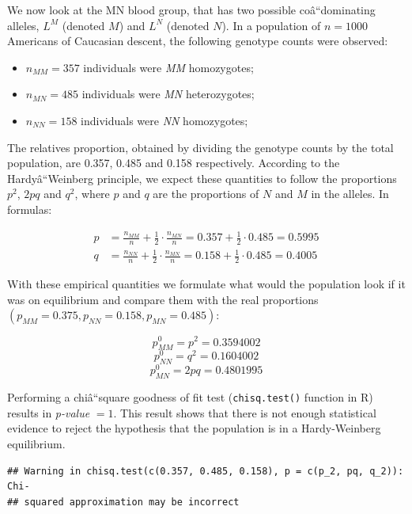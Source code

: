 \documentclass[]{article}
\begin{document}
We now look at the MN blood group, that has two possible
coâ``dominating alleles, \(L^{M}\) (denoted \(M\)) and \(L^{N}\)
(denoted \(N\)). In a population of \(n = 1000\) Americans of Caucasian
descent, the following genotype counts were observed:

\begin{itemize}
\item
  \(n_{MM} = 357\) individuals were \emph{MM} homozygotes;
\item
  \(n_{MN} = 485\) individuals were \emph{MN} heterozygotes;
\item
  \(n_{NN} = 158\) individuals were \emph{NN} homozygotes;
\end{itemize}

The relatives proportion, obtained by dividing the genotype counts by
the total population, are 0.357, 0.485 and 0.158 respectively. According
to the Hardyâ``Weinberg principle, we expect these quantities to follow
the proportions \(p^2\), \(2pq\) and \(q^2\), where \(p\) and \(q\) are
the proportions of \(N\) and \(M\) in the alleles. In formulas:

\begin{equation}
  \begin{split}
    p & = \frac{n_{MM}}{n} + \frac{1}{2} \cdot \frac{n_{MN}}{n} = 0.357 + \frac{1}{2} \cdot 0.485 = 0.5995 \\
    q & = \frac{n_{NN}}{n} + \frac{1}{2} \cdot \frac{n_{MN}}{n} = 0.158 + \frac{1}{2} \cdot 0.485 = 0.4005 
  \end{split}
\end{equation}

With these empirical quantities we formulate what would the population
look if it was on equilibrium and compare them with the real proportions
\(\left(p_{MM}=0.375, p_{NN}=0.158, p_{MN}=0.485\right)\):

\[p_{MM}^0 = p^{2} = 0.3594002\] \[p_{NN}^0 = q^{2} = 0.1604002\]
\[p_{MN}^0 = 2pq = 0.4801995\]

Performing a chiâ``square goodness of fit test (\texttt{chisq.test()}
function in R) results in \emph{p-value} \(= 1\). This result shows that
there is not enough statistical evidence to reject the hypothesis that
the population is in a Hardy-Weinberg equilibrium.

\begin{verbatim}
## Warning in chisq.test(c(0.357, 0.485, 0.158), p = c(p_2, pq, q_2)): Chi-
## squared approximation may be incorrect
\end{verbatim}
\end{document}
